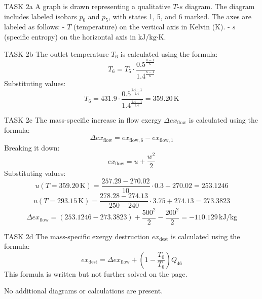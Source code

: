 TASK 2a  
A graph is drawn representing a qualitative \( T \)-\( s \) diagram. The diagram includes labeled isobars \( p_0 \) and \( p_5 \), with states 1, 5, and 6 marked. The axes are labeled as follows:  
- \( T \) (temperature) on the vertical axis in Kelvin (K).  
- \( s \) (specific entropy) on the horizontal axis in \( \text{kJ}/\text{kg·K} \).  

TASK 2b  
The outlet temperature \( T_6 \) is calculated using the formula:  
\[
T_6 = T_5 \cdot \frac{0.5^{\frac{\kappa - 1}{\kappa}}}{1.4^{\frac{\kappa - 1}{\kappa}}}
\]  
Substituting values:  
\[
T_6 = 431.9 \cdot \frac{0.5^{\frac{1.4 - 1}{1.4}}}{1.4^{\frac{1.4 - 1}{1.4}}} = 359.20 \, \text{K}
\]  

TASK 2c  
The mass-specific increase in flow exergy \( \Delta ex_{\text{flow}} \) is calculated using the formula:  
\[
\Delta ex_{\text{flow}} = ex_{\text{flow},6} - ex_{\text{flow},1}
\]  
Breaking it down:  
\[
ex_{\text{flow}} = u + \frac{w^2}{2}
\]  
Substituting values:  
\[
u(T = 359.20 \, \text{K}) = \frac{257.29 - 270.02}{10} \cdot 0.3 + 270.02 = 253.1246
\]  
\[
u(T = 293.15 \, \text{K}) = \frac{278.28 - 274.13}{250 - 240} \cdot 3.75 + 274.13 = 273.3823
\]  
\[
\Delta ex_{\text{flow}} = (253.1246 - 273.3823) + \frac{500^2}{2} - \frac{200^2}{2} = -110.129 \, \text{kJ/kg}
\]  

TASK 2d  
The mass-specific exergy destruction \( ex_{\text{dest}} \) is calculated using the formula:  
\[
ex_{\text{dest}} = \Delta ex_{\text{flow}} + \left( 1 - \frac{T_0}{T_6} \right) Q_{46}
\]  
This formula is written but not further solved on the page.  

No additional diagrams or calculations are present.